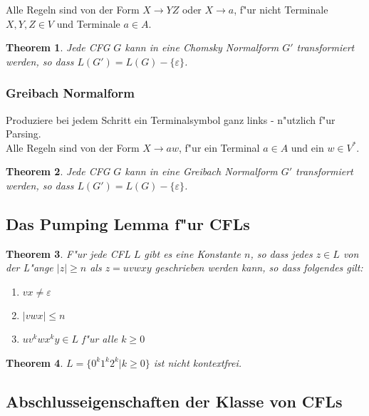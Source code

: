 \documentclass[german, 10pt, a4paper, twocolumn]{scrartcl}
\newtheorem{theorem}{Theorem}[section]
\theoremstyle{definition}
\theoremstyle{example}
\begin{document}
Alle Regeln sind von der Form $X \rightarrow YZ$ oder $X \rightarrow a$, f"ur nicht Terminale $X,Y,Z \in V$ und Terminale $a \in A$.

\begin{theorem}
	Jede CFG $G$ kann in eine Chomsky Normalform $G'$ transformiert werden, so dass $L(G') = L(G) -\{\varepsilon\}$.
\end{theorem}

\subsubsection{Greibach Normalform}

Produziere bei jedem Schritt ein Terminalsymbol ganz links - n"utzlich f"ur Parsing.\\

Alle Regeln sind von der Form $X \rightarrow a w$, f"ur ein Terminal $a\in A$ und ein $w \in V^*$.

\begin{theorem}
	Jede CFG $G$ kann in eine Greibach Normalform $G'$ transformiert werden, so dass $L(G') = L(G)-\{\varepsilon\}$.
\end{theorem}


\subsection{Das Pumping Lemma f"ur CFLs}

\begin{theorem}
	F"ur jede CFL $L$ gibt es eine Konstante $n$, so dass jedes $z\in L$ von der L"ange $|z|\geq n$ als $z=u v w x y$ geschrieben werden kann, so dass folgendes gilt:
	\begin{enumerate}
		\item $v x \neq \varepsilon$
		\item $|v w x| \leq n$
		\item $u v^k w x^k y \in L$ f"ur alle $k\geq 0$
	\end{enumerate}
\end{theorem}

\begin{theorem}
	$L= \{ 0^k 1^k 2^k | k\geq 0 \}$ ist nicht kontextfrei.
\end{theorem}

\subsection{Abschlusseigenschaften der Klasse von CFLs}
\end{document}
